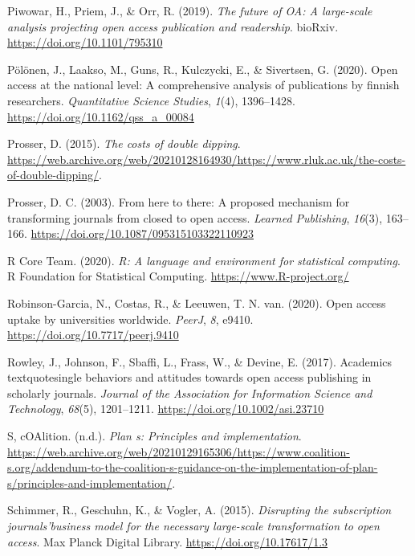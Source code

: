 \documentclass[a4paper,man,floatsintext,longtable,noextraspace,12pt]{apa6}
\newenvironment{CSLReferences}%
  {}%
  {\par}
\begin{document}
\begin{CSLReferences}{1}{0}
\leavevmode\hypertarget{ref-Piwowar_2019}{}%
Piwowar, H., Priem, J., \& Orr, R. (2019). \emph{The future of {OA}: A
large-scale analysis projecting open access publication and readership}.
{bioRxiv}. \url{https://doi.org/10.1101/795310}

\leavevmode\hypertarget{ref-P_l_nen_2020}{}%
Pölönen, J., Laakso, M., Guns, R., Kulczycki, E., \& Sivertsen, G.
(2020). Open access at the national level: A comprehensive analysis of
publications by finnish researchers. \emph{Quantitative Science
Studies}, \emph{1}(4), 1396--1428.
\url{https://doi.org/10.1162/qss_a_00084}

\leavevmode\hypertarget{ref-Prosser_2015}{}%
Prosser, D. (2015). \emph{{The costs of double dipping}}.
\url{https://web.archive.org/web/20210128164930/https://www.rluk.ac.uk/the-costs-of-double-dipping/}.

\leavevmode\hypertarget{ref-Prosser_2003}{}%
Prosser, D. C. (2003). From here to there: A proposed mechanism for
transforming journals from closed to open access. \emph{Learned
Publishing}, \emph{16}(3), 163--166.
\url{https://doi.org/10.1087/095315103322110923}

\leavevmode\hypertarget{ref-r}{}%
R Core Team. (2020). \emph{R: A language and environment for statistical
computing}. R Foundation for Statistical Computing.
\url{https://www.R-project.org/}

\leavevmode\hypertarget{ref-Robinson_Garcia_2020}{}%
Robinson-Garcia, N., Costas, R., \& Leeuwen, T. N. van. (2020). Open
access uptake by universities worldwide. \emph{{PeerJ}}, \emph{8},
e9410. \url{https://doi.org/10.7717/peerj.9410}

\leavevmode\hypertarget{ref-Rowley_2017}{}%
Rowley, J., Johnson, F., Sbaffi, L., Frass, W., \& Devine, E. (2017).
Academics{\hfill\break
textquotesingle} behaviors and attitudes towards open access publishing
in scholarly journals. \emph{Journal of the Association for Information
Science and Technology}, \emph{68}(5), 1201--1211.
\url{https://doi.org/10.1002/asi.23710}

\leavevmode\hypertarget{ref-Plan_s}{}%
S, cOAlition. (n.d.). \emph{Plan s: Principles and implementation}.
\url{https://web.archive.org/web/20210129165306/https://www.coalition-s.org/addendum-to-the-coalition-s-guidance-on-the-implementation-of-plan-s/principles-and-implementation/}.

\leavevmode\hypertarget{ref-Schimmer_2015}{}%
Schimmer, R., Geschuhn, K., \& Vogler, A. (2015). \emph{{Disrupting the
subscription journals'business model for the necessary large-scale
transformation to open access}}. Max Planck Digital Library.
\url{https://doi.org/10.17617/1.3}


\end{CSLReferences}
\end{document}
